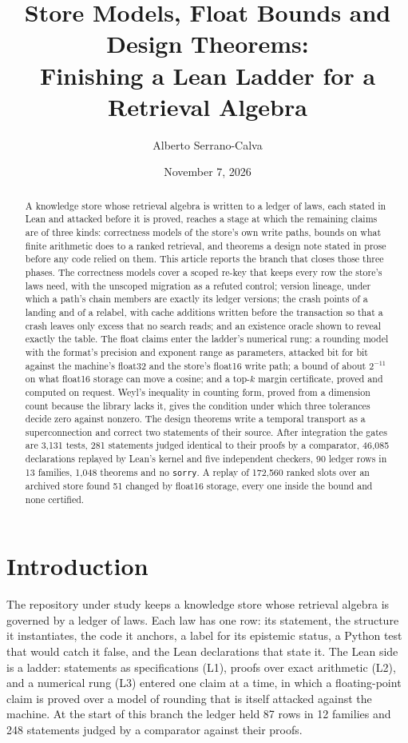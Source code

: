 \documentclass[11pt]{article}
\title{Store Models, Float Bounds and Design Theorems:\\
Finishing a Lean Ladder for a Retrieval Algebra}
\author{Alberto Serrano-Calva}
\date{November 7, 2026}
\theoremstyle{plain}
\theoremstyle{definition}
\theoremstyle{remark}
\begin{document}
\maketitle

\begin{abstract}
A knowledge store whose retrieval algebra is written to a ledger of laws, each stated in Lean and
attacked before it is proved, reaches a stage at which the remaining claims are of three kinds:
correctness models of the store's own write paths, bounds on what finite arithmetic does to a
ranked retrieval, and theorems a design note stated in prose before any code relied on them. This
article reports the branch that closes those three phases. The correctness models cover a scoped
re-key that keeps every row the store's laws need, with the unscoped migration as a refuted
control; version lineage, under which a path's chain members are exactly its ledger versions; the
crash points of a landing and of a relabel, with cache additions written before the transaction so
that a crash leaves only excess that no search reads; and an existence oracle shown to reveal
exactly the table. The float claims enter the ladder's numerical rung: a rounding model with the
format's precision and exponent range as parameters, attacked bit for bit against the machine's
float32 and the store's float16 write path; a bound of about $2^{-11}$ on what float16 storage
can move a cosine; and a top-$k$ margin certificate, proved and computed on request. Weyl's
inequality in counting form, proved from a dimension count because the library lacks it, gives
the condition under which three tolerances decide zero against nonzero. The design theorems write
a temporal transport as a superconnection and correct two statements of their source. After
integration the gates are 3,131 tests, 281 statements judged identical to their proofs by a
comparator, 46,085 declarations replayed by Lean's kernel and five independent checkers, 90
ledger rows in 13 families, 1,048 theorems and no \texttt{sorry}. A replay of 172,560 ranked slots over an archived
store found 51 changed by float16 storage, every one inside the bound and none certified.
\end{abstract}

\section{Introduction}

The repository under study \citep{mindpalace2026} keeps a knowledge store whose retrieval
algebra is governed by a ledger of laws. Each law has one row: its statement, the structure it
instantiates, the code it anchors, a label for its epistemic status, a Python test that would
catch it false, and the Lean declarations that state it. The Lean side is a ladder: statements as
specifications (L1), proofs over exact arithmetic (L2), and a numerical rung (L3) entered one
claim at a time, in which a floating-point claim is proved over a model of rounding that is itself
attacked against the machine. At the start of this branch the ledger held 87 rows in 12 families
and 248 statements judged by a comparator against their proofs.
\end{document}
